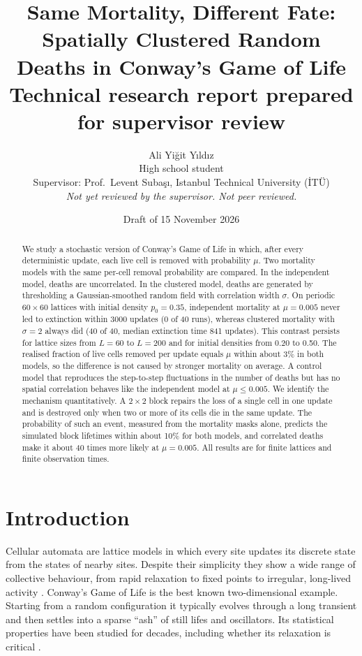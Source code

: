 \documentclass[11pt,a4paper]{article}
\title{\textbf{Same Mortality, Different Fate:\\ Spatially Clustered Random Deaths in Conway's Game of Life}\\[4pt]
\large Technical research report prepared for supervisor review}
\author{Ali Yi\u{g}it Y\i ld\i z\\[2pt]
\small High school student\\
\small Supervisor: Prof.\ Levent Suba\c{s}\i{}, Istanbul Technical University (\.{I}T\"{U})\\[4pt]
\small\itshape Not yet reviewed by the supervisor. Not peer reviewed.}
\date{Draft of 15 November 2026}
\begin{document}
\maketitle

\begin{abstract}
We study a stochastic version of Conway's Game of Life in which, after every deterministic update, each live cell is removed with probability $\mu$. Two mortality models with the same per-cell removal probability are compared. In the independent model, deaths are uncorrelated. In the clustered model, deaths are generated by thresholding a Gaussian-smoothed random field with correlation width $\sigma$. On periodic $60\times60$ lattices with initial density $p_0=0.35$, independent mortality at $\mu=0.005$ never led to extinction within 3000 updates (0 of 40 runs), whereas clustered mortality with $\sigma=2$ always did (40 of 40, median extinction time 841 updates). This contrast persists for lattice sizes from $L=60$ to $L=200$ and for initial densities from 0.20 to 0.50. The realised fraction of live cells removed per update equals $\mu$ within about 3\% in both models, so the difference is not caused by stronger mortality on average. A control model that reproduces the step-to-step fluctuations in the number of deaths but has no spatial correlation behaves like the independent model at $\mu\le0.005$. We identify the mechanism quantitatively. A $2\times2$ block repairs the loss of a single cell in one update and is destroyed only when two or more of its cells die in the same update. The probability of such an event, measured from the mortality masks alone, predicts the simulated block lifetimes within about 10\% for both models, and correlated deaths make it about 40 times more likely at $\mu=0.005$. All results are for finite lattices and finite observation times.
\end{abstract}

\section{Introduction}

Cellular automata are lattice models in which every site updates its discrete state from the states of nearby sites. Despite their simplicity they show a wide range of collective behaviour, from rapid relaxation to fixed points to irregular, long-lived activity \cite{wolfram1983,wolfram1984}. Conway's Game of Life \cite{gardner1970} is the best known two-dimensional example. Starting from a random configuration it typically evolves through a long transient and then settles into a sparse ``ash'' of still lifes and oscillators. Its statistical properties have been studied for decades, including whether its relaxation is critical \cite{bak1989,bennett1991,blok1999}.
\end{document}
